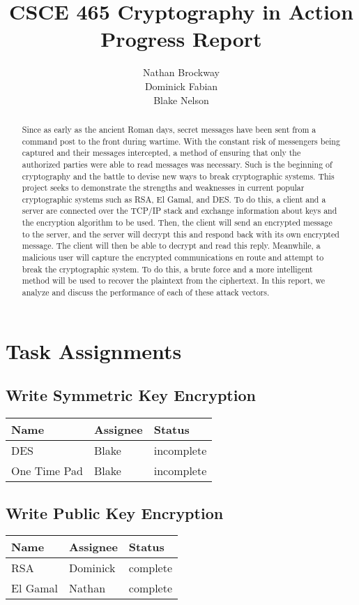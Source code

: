 \documentclass[12pt]{report}
\title{CSCE 465 Cryptography in Action Progress Report}
\author{Nathan Brockway\\Dominick Fabian\\Blake Nelson}
\begin{document}
\maketitle

\begin{abstract}
    Since as early as the ancient Roman days, secret messages have been sent from a command post to the front during wartime. With the constant risk of messengers being captured and their messages intercepted, a method of ensuring that only the authorized parties were able to read messages was necessary. Such is the beginning of cryptography and the battle to devise new ways to break cryptographic systems. This project seeks to demonstrate the strengths and weaknesses in current popular cryptographic systems such as RSA, El Gamal, and DES. To do this, a client and a server are connected over the TCP/IP stack and exchange information about keys and the encryption algorithm to be used. Then, the client will send an encrypted message to the server, and the server will decrypt this and respond back with its own encrypted message. The client will then be able to decrypt and read this reply. Meanwhile, a malicious user will capture the encrypted communications en route and attempt to break the cryptographic system. To do this, a brute force and a more intelligent method will be used to recover the plaintext from the ciphertext. In this report, we analyze and discuss the performance of each of these attack vectors.
\end{abstract}

\section{Task Assignments}
\subsection{Write Symmetric Key Encryption}
\begin{tabular}{l|l|l}
    Name & Assignee & Status \\ \hline
    DES & Blake & incomplete \\
    One Time Pad & Blake & incomplete	 
\end{tabular}

\subsection{Write Public Key Encryption}
\begin{tabular}{l|l|l}
    Name & Assignee & Status \\ \hline
    RSA & Dominick & complete \\
    El Gamal & Nathan & complete
\end{tabular}
\end{document}
